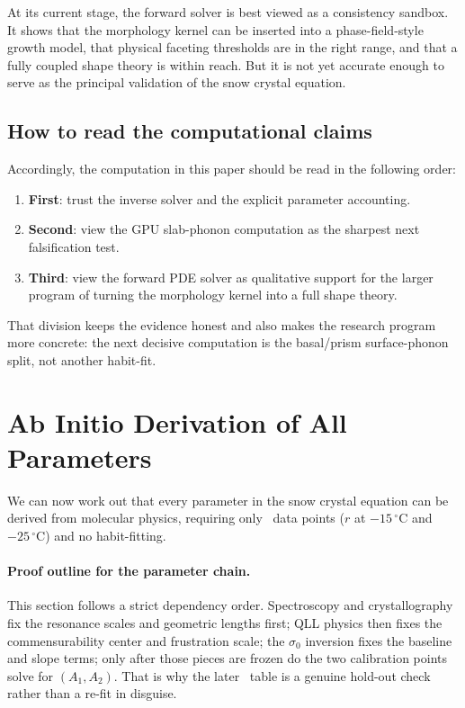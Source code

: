 \documentclass[12pt,letterpaper]{article}
\begin{document}
At its current stage, the forward solver is best viewed as a
consistency sandbox.
It shows that the morphology kernel can be inserted into a
phase-field-style growth model, that physical faceting thresholds are
in the right range, and that a fully coupled shape theory is within
reach.
But it is not yet accurate enough to serve as the principal validation
of the snow crystal equation.

\subsection{How to read the computational claims}

Accordingly, the computation in this paper should be read in the
following order:
\begin{enumerate}[nosep]
\item \textbf{First}: trust the inverse solver and the explicit
      parameter accounting.
\item \textbf{Second}: view the GPU slab-phonon computation as the
      sharpest next falsification test.
\item \textbf{Third}: view the forward PDE solver as qualitative
      support for the larger program of turning the morphology kernel
      into a full shape theory.
\end{enumerate}

That division keeps the evidence honest and also makes the research
program more concrete: the next decisive computation is the
basal/prism surface-phonon split, not another habit-fit.

\section{Ab Initio Derivation of All Parameters}
\label{sec:abinitio}

We can now work out that every parameter in the snow crystal equation can be derived from molecular physics, requiring only \SnowCalibrationPoints\ data points ($r$ at $-15\,{}^\circ$C and $-25\,{}^\circ$C) and no habit-fitting.
\paragraph{Proof outline for the parameter chain.}
This section follows a strict dependency order.
Spectroscopy and crystallography fix the resonance scales and geometric lengths first; QLL physics then fixes the commensurability center and frustration scale; the $\sigma_0$ inversion fixes the baseline and slope terms; only after those pieces are frozen do the two calibration points solve for $(A_1,A_2)$.
That is why the later \SnowPredictionMatch\ table is a genuine hold-out check rather than a re-fit in disguise.
\end{document}
